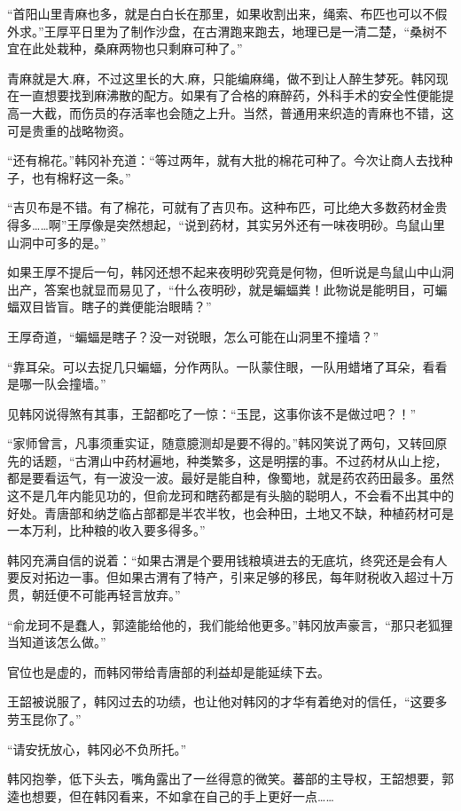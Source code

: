 “首阳山里青麻也多，就是白白长在那里，如果收割出来，绳索、布匹也可以不假外求。”王厚平日里为了制作沙盘，在古渭跑来跑去，地理已是一清二楚，“桑树不宜在此处栽种，桑麻两物也只剩麻可种了。”

青麻就是大.麻，不过这里长的大.麻，只能编麻绳，做不到让人醉生梦死。韩冈现在一直想要找到麻沸散的配方。如果有了合格的麻醉药，外科手术的安全性便能提高一大截，而伤员的存活率也会随之上升。当然，普通用来织造的青麻也不错，这可是贵重的战略物资。

“还有棉花。”韩冈补充道：“等过两年，就有大批的棉花可种了。今次让商人去找种子，也有棉籽这一条。”

“吉贝布是不错。有了棉花，可就有了吉贝布。这种布匹，可比绝大多数药材金贵得多……啊”王厚像是突然想起，“说到药材，其实另外还有一味夜明砂。鸟鼠山里山洞中可多的是。”

如果王厚不提后一句，韩冈还想不起来夜明砂究竟是何物，但听说是鸟鼠山中山洞出产，答案也就显而易见了，“什么夜明砂，就是蝙蝠粪！此物说是能明目，可蝙蝠双目皆盲。瞎子的粪便能治眼睛？”

王厚奇道，“蝙蝠是瞎子？没一对锐眼，怎么可能在山洞里不撞墙？”

“靠耳朵。可以去捉几只蝙蝠，分作两队。一队蒙住眼，一队用蜡堵了耳朵，看看是哪一队会撞墙。”

见韩冈说得煞有其事，王韶都吃了一惊：“玉昆，这事你该不是做过吧？！”

“家师曾言，凡事须重实证，随意臆测却是要不得的。”韩冈笑说了两句，又转回原先的话题，“古渭山中药材遍地，种类繁多，这是明摆的事。不过药材从山上挖，都是要看运气，有一波没一波。最好是能自种，像蜀地，就是药农药田最多。虽然这不是几年内能见功的，但俞龙珂和瞎药都是有头脑的聪明人，不会看不出其中的好处。青唐部和纳芝临占部都是半农半牧，也会种田，土地又不缺，种植药材可是一本万利，比种粮的收入要多得多。”

韩冈充满自信的说着：“如果古渭是个要用钱粮填进去的无底坑，终究还是会有人要反对拓边一事。但如果古渭有了特产，引来足够的移民，每年财税收入超过十万贯，朝廷便不可能再轻言放弃。”

“俞龙珂不是蠢人，郭逵能给他的，我们能给他更多。”韩冈放声豪言，“那只老狐狸当知道该怎么做。”

官位也是虚的，而韩冈带给青唐部的利益却是能延续下去。

王韶被说服了，韩冈过去的功绩，也让他对韩冈的才华有着绝对的信任，“这要多劳玉昆你了。”

“请安抚放心，韩冈必不负所托。”

韩冈抱拳，低下头去，嘴角露出了一丝得意的微笑。蕃部的主导权，王韶想要，郭逵也想要，但在韩冈看来，不如拿在自己的手上更好一点……


